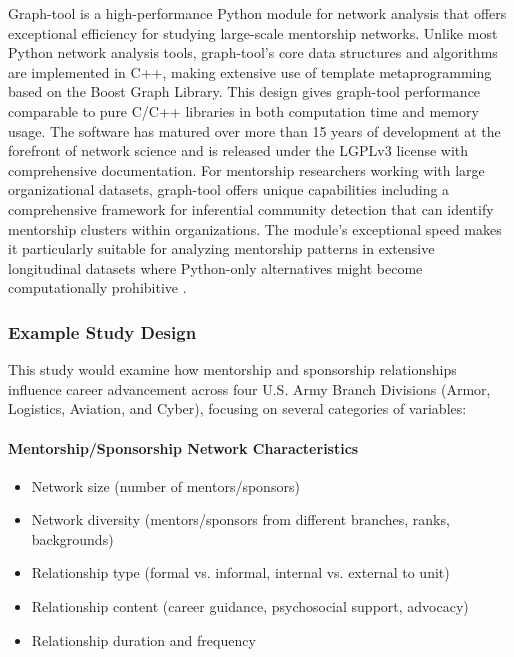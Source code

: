 \documentclass[main.tex]{subfiles}
\begin{document}
Graph-tool is a high-performance Python module for network analysis that offers exceptional efficiency for studying large-scale mentorship networks. Unlike most Python network analysis tools, graph-tool's core data structures and algorithms are implemented in C++, making extensive use of template metaprogramming based on the Boost Graph Library. This design gives graph-tool performance comparable to pure C/C++ libraries in both computation time and memory usage. The software has matured over more than 15 years of development at the forefront of network science and is released under the LGPLv3 license with comprehensive documentation. For mentorship researchers working with large organizational datasets, graph-tool offers unique capabilities including a comprehensive framework for inferential community detection that can identify mentorship clusters within organizations. The module's exceptional speed makes it particularly suitable for analyzing mentorship patterns in extensive longitudinal datasets where Python-only alternatives might become computationally prohibitive \parencite{graphtool2023python}.

\subsubsection{Example Study Design}


This study would examine how mentorship and sponsorship relationships influence career advancement across four U.S. Army Branch Divisions (Armor, Logistics, Aviation, and Cyber), focusing on several categories of variables:

\paragraph{Mentorship/Sponsorship Network Characteristics}
\begin{itemize}
\item Network size (number of mentors/sponsors)
\item Network diversity (mentors/sponsors from different branches, ranks, backgrounds)
\item Relationship type (formal vs. informal, internal vs. external to unit)
\item Relationship content (career guidance, psychosocial support, advocacy)
\item Relationship duration and frequency
\end{itemize}
\end{document}
